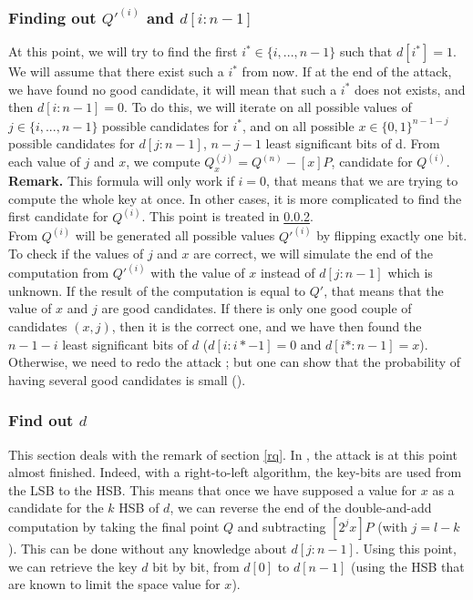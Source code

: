 \documentclass[journal]{IEEEtran}
\begin{document}
\subsubsection{Finding out $Q'^{(i)}$ and $d[i:n-1]$}
At this point, we will try to find the first $i^* \in \{i, ..., n-1\}$ such that $d[i^*] = 1$. We will assume that there exist such a $i^*$ from now.
If at the end of the attack, we have found no good candidate, it will mean that such a $i^*$ does not exists, and then $d[i:n-1] = 0$.
To do this, we will iterate on all possible values of $j \in \{i, ..., n-1\}$ possible candidates for $i^*$, and on all possible $x \in \{0, 1\}^{n-1-j}$ 
possible candidates for $d[j:n-1]$, $n - j - 1$ least significant bits of d.
From each value of $j$ and $x$, we compute $Q_x^{(j)} = Q^{(n)} - [x]P$, candidate for $Q^{(i)}$. \\

\label{rq}
{\bf Remark.} This formula will only work if $i = 0$, that means that we are trying to compute the whole key at once. In other cases, it is more complicated
to find the first candidate for $Q^{(i)}$. This point is treated in \ref{difficulties}.\\


From $Q^{(i)}$ will be generated all possible values $Q'^{(i)}$ by flipping exactly one bit. To check if the values of $j$ and $x$ are correct, 
we will simulate the end of the computation from $Q'^{(i)}$ with the value of $x$ instead of $d[j:n-1]$ which is unknown. If the result of the computation
is equal to $Q'$, that means that the value of $x$ and $j$ are good candidates.
If there is only one good couple of candidates $(x, j)$, then it is the correct one, and we have then found the $n - 1 - i$ least significant bits of $d$ ($d[i:i*-1] = 0$ and $d[i*:n-1] = x$).
Otherwise, we need to redo the attack ; but one can show that the probability of having several good candidates is small 
(\cite{biehl2000differential}).\\

\subsubsection{Find out $d$}
\label{difficulties}
This section deals with the remark of section \ref{rq}.
In \cite{biehl2000differential}, the attack is at this point almost finished. Indeed, with a right-to-left algorithm, the key-bits are used from the LSB to the HSB. This means that 
once we have supposed a value for $x$ as a candidate for the $k$ HSB of $d$, we can reverse the end of the double-and-add computation by taking the final point 
$Q$ and subtracting $[2^{j}x]P$ (with $j = l - k$). This can be done without any knowledge about $d[j:n-1]$. Using this point, we can retrieve the key $d$ bit by bit, from $d[0]$ to 
$d[n-1]$ (using the HSB that are known to limit the space value for $x$).\\
\end{document}
